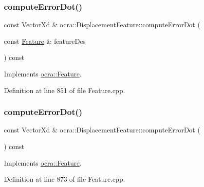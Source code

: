 \subsubsection{\texorpdfstring{compute\+Error\+Dot()}{computeErrorDot()}\hspace{0.1cm}{\footnotesize\ttfamily [1/2]}}
{\footnotesize\ttfamily const Vector\+Xd \& ocra\+::\+Displacement\+Feature\+::compute\+Error\+Dot (\begin{DoxyParamCaption}\item[{const \hyperlink{classocra_1_1Feature}{Feature} \&}]{feature\+Des }\end{DoxyParamCaption}) const\hspace{0.3cm}{\ttfamily [virtual]}}



Implements \hyperlink{classocra_1_1Feature_ac714181e1bb25f878349e299c4ba8c00}{ocra\+::\+Feature}.



Definition at line 851 of file Feature.\+cpp.

\hypertarget{classocra_1_1DisplacementFeature_a684821d2a83945c63661eacdf4bcd262}{}\label{classocra_1_1DisplacementFeature_a684821d2a83945c63661eacdf4bcd262} 
\subsubsection{\texorpdfstring{compute\+Error\+Dot()}{computeErrorDot()}\hspace{0.1cm}{\footnotesize\ttfamily [2/2]}}
{\footnotesize\ttfamily const Vector\+Xd \& ocra\+::\+Displacement\+Feature\+::compute\+Error\+Dot (\begin{DoxyParamCaption}{ }\end{DoxyParamCaption}) const\hspace{0.3cm}{\ttfamily [virtual]}}



Implements \hyperlink{classocra_1_1Feature_a01a4870418ba87d5b41d8f917c1255fc}{ocra\+::\+Feature}.



Definition at line 873 of file Feature.\+cpp.

\hypertarget{classocra_1_1DisplacementFeature_a87b3ef89ea6711a3f953f94e5cdf7e4d}{}\label{classocra_1_1DisplacementFeature_a87b3ef89ea6711a3f953f94e5cdf7e4d} 
